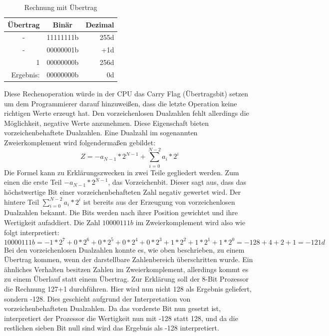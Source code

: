 \documentclass[12pt]{article}
\begin{document}
\begin{table}[!htb]
\centering
\caption{Rechnung mit Übertrag}
\label{my-label}
\begin{tabular}{|c|r|r|}
\hline
\textbf{Übertrag}               & \multicolumn{1}{c|}{\textbf{Binär}} & \multicolumn{1}{c|}{\textbf{Dezimal}} \\ \hline
-                               & 11111111b                            & 255d                                   \\ \hline
-                               & 00000001b                            & +1d                                     \\ \hline
\multicolumn{1}{|r|}{1}         & 00000000b                            & 256d                                   \\ \hline\hline
\multicolumn{1}{|r|}{Ergebnis:} & 00000000b                            & 0d                                     \\ \hline
\end{tabular}
\end{table}
Diese Rechenoperation würde in der CPU das Carry Flag (Übertragsbit) setzen um dem Programmierer darauf hinzuweißen, dass die letzte Operation keine richtigen Werte erzeugt hat. Den vorzeichenlosen Dualzahlen fehlt allerdings die Möglichkeit, negative Werte anzunehmen. Diese Eigenschaft bieten vorzeichenbehaftete Dualzahlen. Eine Dualzahl im sogenannten Zweierkomplement wird folgendermaßen gebildet:
$$Z=-a_{N-1}*2^{N-1}+\sum\limits_{i=0}^{N-2} a_i * 2^i$$
Die Formel kann zu Erklärungszwecken in zwei Teile gegliedert werden. Zum einen die erste Teil $-a_{N-1}*2^{N-1}$, das Vorzeichenbit. Dieser sagt aus, dass das höchstwertige Bit einer vorzeichenbehafteten Zahl negativ gewertet wird. Der hintere Teil $\sum\limits_{i=0}^{N-2} a_i * 2^i$ ist bereits aus der Erzeugung von vorzeichenlosen Dualzahlen bekannt. Die Bits werden nach ihrer Position gewichtet und ihre Wertigkeit aufaddiert. Die Zahl $10000111b$ im Zweierkomplement wird also wie folgt interpretiert:
$$10000111b = -1*2^7+0*2^6+0*2^5+0*2^4+0*2^3+1*2^2+1*2^1+1*2^0 = -128+4+2+1 = -121d$$
Bei den vorzeichenlosen Dualzahlen konnte es, wie oben beschrieben, zu einem Übertrag kommen, wenn der darstellbare Zahlenbereich überschritten wurde. Ein ähnliches Verhalten besitzen Zahlen im Zweierkomplement, allerdings kommt es zu einem Überlauf statt einem Übertrag. Zur Erklärung soll der 8-Bit Prozessor die Rechnung 127+1 durchführen. Hier wird nun nicht 128 als Ergebnis geliefert, sondern -128. Dies geschieht aufgrund der Interpretation von vorzeichenbehafteten Dualzahlen. Da das vorderste Bit nun gesetzt ist, interpretiert der Prozessor die Wertigkeit nun mit -128 statt 128, und da die restlichen sieben Bit null sind wird das Ergebnis als -128 interpretiert.
\end{document}
